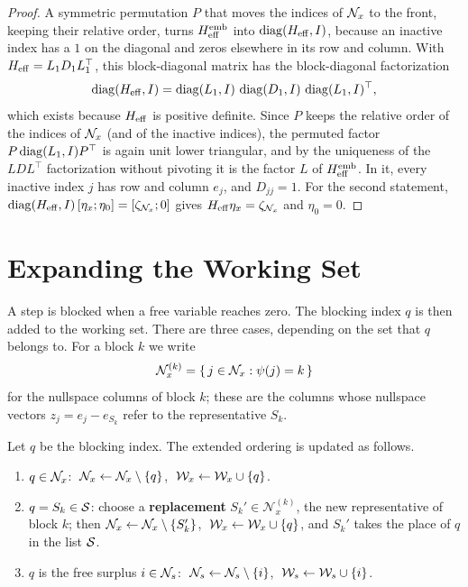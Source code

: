 \begin{proof}
A symmetric permutation $P$ that moves the indices of $\mathcal{N}_x$ to the front, keeping their
relative order, turns $H_{\mathrm{eff}}^{\mathrm{emb}}$ into $\operatorname{diag}(H_{\mathrm{eff}}, I)$, because an inactive index has a $1$ on the
diagonal and zeros elsewhere in its row and column. With $H_{\mathrm{eff}} = L_1D_1L_1^\top$, this
block-diagonal matrix has the block-diagonal factorization
\[
\operatorname{diag}(H_{\mathrm{eff}}, I) = \operatorname{diag}(L_1,I)\,\operatorname{diag}(D_1,I)\,\operatorname{diag}(L_1,I)^\top,
\]
which exists because $H_{\mathrm{eff}}$ is positive definite. Since $P$ keeps the relative order of the
indices of $\mathcal{N}_x$ (and of the inactive indices), the permuted factor $P\operatorname{diag}(L_1,I)P^\top$ is again
unit lower triangular, and by the uniqueness of the $LDL^\top$ factorization without pivoting
it is the factor $L$ of $H_{\mathrm{eff}}^{\mathrm{emb}}$. In it, every inactive index $j$ has row and column
$e_j$, and $D_{jj} = 1$. For the second
statement, $\operatorname{diag}(H_{\mathrm{eff}}, I)\,[\eta_x;\eta_0] = [\zeta_{\mathcal{N}_x}; 0]$ gives $H_{\mathrm{eff}}\eta_x = \zeta_{\mathcal{N}_x}$ and
$\eta_0 = 0$.
\end{proof}


\section{Expanding the Working Set}
\label{sec:expanding}

A step is blocked when a free variable reaches zero. The blocking index $q$ is then added to
the working set. There are three cases, depending on the set that $q$ belongs to. For a block
$k$ we write
\[
\mathcal{N}_x^{(k)} = \{\, j\in\mathcal{N}_x : \psi(j) = k \,\}
\]
for the nullspace columns of block $k$; these are the columns whose nullspace vectors
$z_j = e_j - e_{S_k}$ refer to the representative $S_k$.

\begin{lemma} \label{lem:expand-ordering}
Let $q$ be the blocking index. The extended ordering is updated as follows.
\begin{enumerate}
    \item \label{lem:expand-ordering:i} $q\in\mathcal{N}_x$: $\;\mathcal{N}_x\gets\mathcal{N}_x\setminus\{q\}$, $\;\mathcal{W}_x\gets\mathcal{W}_x\cup\{q\}$.
    \item \label{lem:expand-ordering:ii} $q = S_k\in\mathcal{S}$: choose a \textbf{replacement} $S_k'\in\mathcal{N}_x^{(k)}$, the new
          representative of block $k$; then $\mathcal{N}_x\gets\mathcal{N}_x\setminus\{S_k'\}$,
          $\;\mathcal{W}_x\gets\mathcal{W}_x\cup\{q\}$, and $S_k'$ takes the place of $q$ in the list $\mathcal{S}$.
    \item \label{lem:expand-ordering:iii} $q$ is the free surplus $i\in\mathcal{N}_s$: $\;\mathcal{N}_s\gets\mathcal{N}_s\setminus\{i\}$, $\;\mathcal{W}_s\gets\mathcal{W}_s\cup\{i\}$.
\end{enumerate}
\end{lemma}

